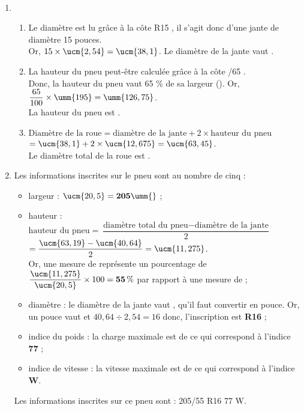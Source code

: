 \ \\ [-5mm]
   \begin{enumerate}
      \item
         \begin{enumerate}
            \item Le diamètre est lu grâce à la côte \og R15 \fg, il s'agit donc d'une jante de diamètre 15 pouces. \\
               Or, $15\times\ucm{2,54} =\ucm{38,1}$. {\blue Le diamètre de la jante vaut }. \\
            \item La hauteur du pneu peut-être calculée grâce à la côte /65 \fg. \\
               Donc, la hauteur du pneu vaut 65 \% de sa largeur (). Or, $\dfrac{65}{100}\times\umm{195} =\umm{126,75}$. \\
               {\blue La hauteur du pneu est }. \\
            \item $\text{Diamètre de la roue} = \text{diamètre de la jante} + 2\times\text{hauteur du pneu}$ \\
               \hspace*{3.38cm} $=\ucm{38,1}+2\times\ucm{12,675}=\ucm{63,45}$. \\
               {\blue Le diamètre total de la roue est }. \\
         \end{enumerate}
      \setcounter{enumi}{1}
      \item Les informations inscrites sur le pneu sont au nombre de cinq :
         \begin{itemize}
            \item largeur : $\ucm{20,5} = {\bf 205} \umm{}$ ;
            \item hauteur : $\text{hauteur du pneu} = \dfrac{\text{diamètre total du pneu}-\text{diamètre de la jante}}{2}$ \\ [1mm]
               \hspace*{4.7cm} $=\dfrac{\ucm{63,19}-\ucm{40,64}}{2} =\ucm{11,275}$. \\ [1mm]
               Or, une mesure de  représente un pourcentage de $\dfrac{\ucm{11,275}}{\ucm{20,5}}\times100 =\bf{55}\,\%$ par rapport à une mesure de  ;
            \item diamètre : le diamètre de la jante vaut , qu'il faut convertir en pouce. Or, un pouce vaut  et $40,64\div2,54=16$ donc, l'inscription est {\bf R16} ;
            \item indice du poids : la charge maximale est de  ce qui correspond à l'indice {\bf 77} ;
            \item indice de vitesse : la vitesse maximale est de  ce qui correspond à l'indice {\bf W}. \\
         \end{itemize}
         {\blue Les informations inscrites sur ce pneu sont : 205/55 R16 77 W}.
   \end{enumerate}

